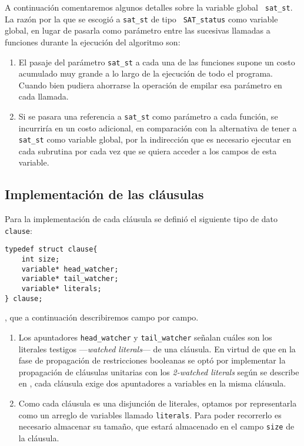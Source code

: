 \documentclass[12pt,lettersize,oneside]{article}
\begin{document}
A continuación comentaremos algunos detalles sobre la variable global {\tt
  sat\_st}. La razón por la que se escogió a {\tt sat\_st} de tipo {\tt
  SAT\_status} como variable global, en lugar de pasarla como parámetro entre
las sucesivas llamadas a funciones durante la ejecución del algoritmo son:
\begin{enumerate}
\item El pasaje del parámetro {\tt sat\_st} a cada una de las funciones supone
  un costo acumulado muy grande a lo largo de la ejecución de todo el
  programa. Cuando bien pudiera ahorrarse la operación de empilar esa parámetro
  en cada llamada.
\item Si se pasara una referencia a {\tt sat\_st} como parámetro a cada función,
  se incurriría en un costo adicional, en comparación con la alternativa de
  tener a {\tt sat\_st} como variable global, por la indirección que es
  necesario ejecutar en cada subrutina por cada vez que se quiera acceder a los
  campos de esta variable.
\end{enumerate}

\subsection{Implementación de las cláusulas}

Para la implementación de cada cláusula se definió el siguiente tipo de dato
{\tt clause}:
\begin{lstlisting}
typedef struct clause{
    int size;
    variable* head_watcher;
    variable* tail_watcher;
    variable* literals;
} clause;
\end{lstlisting}
, que a continuación describiremos campo por campo.\vspace{-2.5mm}
\begin{enumerate}
\item Los apuntadores {\tt head\_watcher} y {\tt tail\_watcher} señalan cuáles
  son los literales testigos ---\emph{watched literals}--- de una cláusula. En
  virtud de que en la fase de propagación de restricciones booleanas se optó por
  implementar la propagación de cláusulas unitarias con los \emph{2-watched
    literals} según se describe en \cite{Zhang},
  cada cláusula exige dos apuntadores a variables en la misma cláusula.

\item Como cada cláusula es una disjunción de literales, optamos por
  representarla como un arreglo de variables llamado {\tt literals}. Para poder
  recorrerlo es necesario almacenar su tamaño, que estará almacenado en el campo
  {\tt size} de la cláusula.
\end{enumerate}
\end{document}
